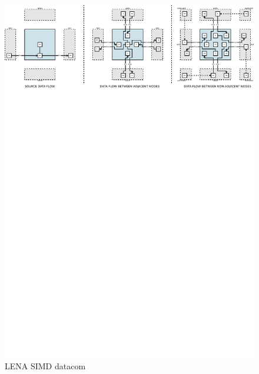 \begin{figure}[h]
  \centering
  \includegraphics[width=\linewidth,clip,trim=0 22cm 0 0]
                  {fig/fpga/fpga-simd-datacom.pdf}
  \caption{LENA SIMD datacom}
  \label{fig:fpga-simd-datacom}
\end{figure}
